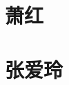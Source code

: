 \documentclass[12pt,utf8]{book}
\begin{document}



\clearpage


\clearpage

\clearpage

\chapter{萧红}



% 






\chapter{张爱玲}








\end{document}
